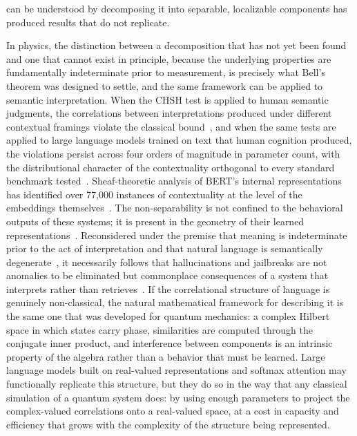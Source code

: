 \documentclass[aps,prl,twocolumn,superscriptaddress,amsmath,amssymb]{revtex4-2}
\begin{document}
can be understood by decomposing it into separable, localizable components has produced results that do not replicate.

In physics, the distinction between a decomposition that has not yet been found and one that cannot exist in principle, because the underlying properties are fundamentally indeterminate prior to measurement, is precisely what Bell's theorem was designed to settle, and the same framework can be applied to semantic interpretation. When the CHSH test is applied to human semantic judgments, the correlations between interpretations produced under different contextual framings violate the classical bound~\cite{busemeyer2012quantum,pothos2013can,aerts2009quantum,wang2014context,bruza2023contextuality,pothos2022quantum}, and when the same tests are applied to large language models trained on text that human cognition produced, the violations persist across four orders of magnitude in parameter count, with the distributional character of the contextuality orthogonal to every standard benchmark tested~\cite{agostino2025quantum,agostino2026production}. Sheaf-theoretic analysis of BERT's internal representations has identified over 77,000 instances of contextuality at the level of the embeddings themselves~\cite{lo2024contextuality,abramsky2011sheaf}. The non-separability is not confined to the behavioral outputs of these systems; it is present in the geometry of their learned representations~\cite{williams2025philosophy,chen2026entanglement}. Reconsidered under the premise that meaning is indeterminate prior to the act of interpretation and that natural language is semantically degenerate~\cite{agostino2025quantum}, it necessarily follows that hallucinations and jailbreaks are not anomalies to be eliminated but commonplace consequences of a system that interprets rather than retrieves~\cite{agostino2026production}. If the correlational structure of language is genuinely non-classical, the natural mathematical framework for describing it is the same one that was developed for quantum mechanics: a complex Hilbert space in which states carry phase, similarities are computed through the conjugate inner product, and interference between components is an intrinsic property of the algebra rather than a behavior that must be learned. Large language models built on real-valued representations and softmax attention may functionally replicate this structure, but they do so in the way that any classical simulation of a quantum system does: by using enough parameters to project the complex-valued correlations onto a real-valued space, at a cost in capacity and efficiency that grows with the complexity of the structure being represented.
\end{document}
